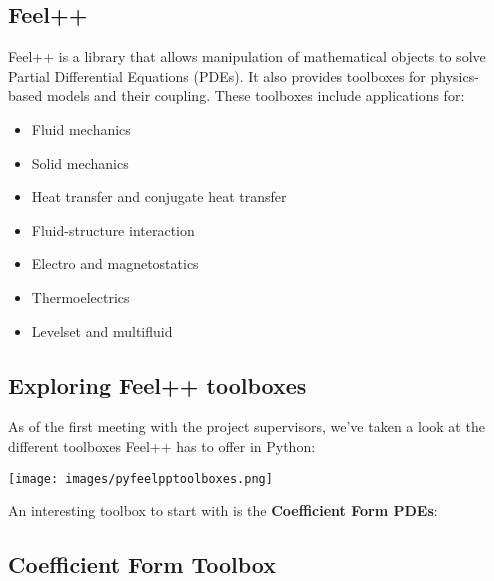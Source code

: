 \documentclass[12pt]{article}
\begin{document}
\newpage


\subsection{Feel++}

Feel++ is a library that allows manipulation of mathematical objects to solve Partial Differential Equations (PDEs). It also provides toolboxes for physics-based models and their coupling. These toolboxes include applications for:

\begin{itemize}
    \item Fluid mechanics
    \item Solid mechanics
    \item Heat transfer and conjugate heat transfer
    \item Fluid-structure interaction
    \item Electro and magnetostatics
    \item Thermoelectrics
    \item Levelset and multifluid
\end{itemize}


\subsection{Exploring Feel++ toolboxes}

As of the first meeting with the project supervisors, we've taken a look at the different toolboxes Feel++ has to offer in Python:
\begin{frame}{}
    \begin{center}
        \texttt{[image: images/pyfeelpptoolboxes.png]}
    \end{center}
\end{frame}

An interesting toolbox to start with is the \textbf{Coefficient Form PDEs}:

\subsection{Coefficient Form Toolbox}
\end{document}
